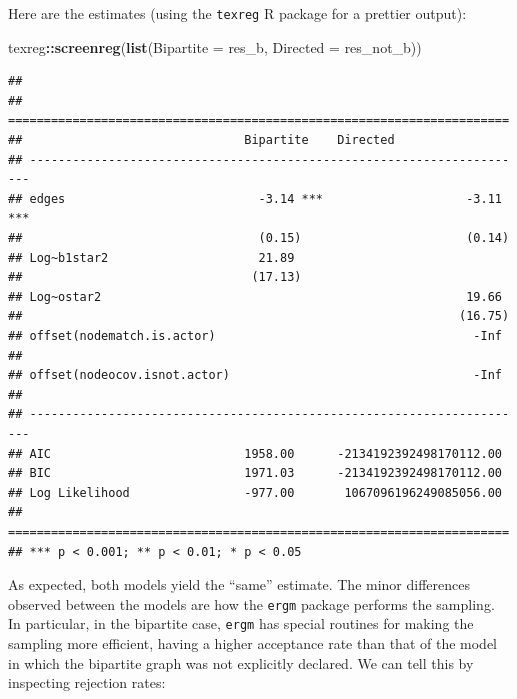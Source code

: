 \documentclass[
]{book}
\newenvironment{Shaded}{\begin{snugshade}}{\end{snugshade}}
\newcommand{\AttributeTok}[1]{\textcolor[rgb]{0.13,0.29,0.53}{#1}}
\newcommand{\FunctionTok}[1]{\textcolor[rgb]{0.13,0.29,0.53}{\textbf{#1}}}
\newcommand{\NormalTok}[1]{#1}
\newcommand{\SpecialCharTok}[1]{\textcolor[rgb]{0.81,0.36,0.00}{\textbf{#1}}}
\begin{document}
Here are the estimates (using the \texttt{texreg} R package for a prettier output):

\begin{Shaded}
\begin{Highlighting}[]
\NormalTok{texreg}\SpecialCharTok{::}\FunctionTok{screenreg}\NormalTok{(}\FunctionTok{list}\NormalTok{(}\AttributeTok{Bipartite =}\NormalTok{ res\_b, }\AttributeTok{Directed =}\NormalTok{ res\_not\_b))}
\end{Highlighting}
\end{Shaded}

\begin{verbatim}
## 
## ======================================================================
##                               Bipartite    Directed                   
## ----------------------------------------------------------------------
## edges                           -3.14 ***                    -3.11 ***
##                                 (0.15)                       (0.14)   
## Log~b1star2                     21.89                                 
##                                (17.13)                                
## Log~ostar2                                                   19.66    
##                                                             (16.75)   
## offset(nodematch.is.actor)                                    -Inf    
##                                                                       
## offset(nodeocov.isnot.actor)                                  -Inf    
##                                                                       
## ----------------------------------------------------------------------
## AIC                           1958.00      -2134192392498170112.00    
## BIC                           1971.03      -2134192392498170112.00    
## Log Likelihood                -977.00       1067096196249085056.00    
## ======================================================================
## *** p < 0.001; ** p < 0.01; * p < 0.05
\end{verbatim}

As expected, both models yield the ``same'' estimate. The minor differences
observed between the models are how the \texttt{ergm} package performs
the sampling. In particular, in the bipartite case, \texttt{ergm} has special
routines for making the sampling more efficient, having a higher acceptance
rate than that of the model in which the bipartite graph was not explicitly
declared. We can tell this by inspecting rejection rates:
\end{document}
